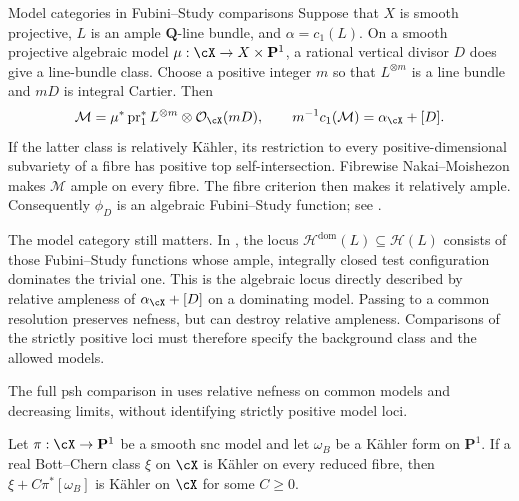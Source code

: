 \noindent\begin{minipage}{\linewidth}
\begin{warning}{Model categories in Fubini--Study comparisons}
\label{warn:mp-h-not-fs}
Suppose that $X$ is smooth projective, $L$ is an ample
$\mathbf Q$-line bundle, and $\alpha=c_1(L)$.  On a smooth projective
algebraic model $\mu:\cX\to X\times\mathbf P^1$, a rational vertical
divisor $D$ does give a line-bundle class.  Choose a positive integer $m$ so that
$L^{\otimes m}$ is a line bundle and $mD$ is integral Cartier.  Then
\[
 \mathcal M=
 \mu^*\operatorname{pr}_1^*L^{\otimes m}\otimes\mathcal O_{\cX}(mD),
 \qquad
 m^{-1}c_1(\mathcal M)=\alpha_{\cX}+[D].
\]
If the latter class is relatively K\"ahler, its restriction to every
positive-dimensional subvariety of a fibre has positive top
self-intersection.  Fibrewise Nakai--Moishezon makes $\mathcal M$ ample on every fibre.
The fibre criterion \cite[Tag~0D2S]{stacks-project} then makes it
relatively ample.
Consequently $\phi_D$ is an algebraic Fubini--Study function; see
\cite[Corollary~2.32]{BJ22}.

The model category still matters.  In
\cite[Definition~3.8 and Example~3.9]{BJ22}, the locus
$\mathcal H^{\mathrm{dom}}(L)\subseteq\mathcal H(L)$ consists of those
Fubini--Study functions whose ample, integrally closed test configuration
dominates the trivial one.  This is the algebraic locus directly described
by relative ampleness of $\alpha_{\cX}+[D]$ on a dominating model.
Passing to a common resolution preserves nefness, but can destroy
relative ampleness.  Comparisons of the strictly positive loci must
therefore specify the background class and the allowed models.

The full psh comparison in  uses
relative nefness on common models and decreasing limits, without
identifying strictly positive model loci.
\end{warning}
\end{minipage}\par

\begin{lemma}
\label{lem:mp-relative-kahler-extension}
Let $\pi:\cX\to\mathbf P^1$ be a smooth snc model and let
$\omega_B$ be a K\"ahler form on $\mathbf P^1$.  If a real
Bott--Chern class $\xi$ on $\cX$ is K\"ahler on every reduced fibre,
then $\xi+C\pi^*[\omega_B]$ is K\"ahler on $\cX$ for some $C\geq0$.
\end{lemma}

